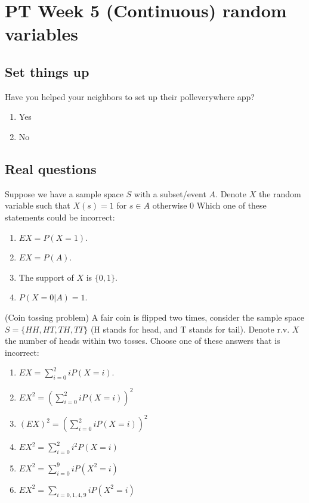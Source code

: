 \documentclass[poll_tutorial_format]{subfiles}
\begin{document}
	\maketitle
	\section{PT Week 5 (Continuous) random variables}
	
	\subsection{Set things up}
	\label{sec:set-things-up}
	
	
	
	\setcounter{theorem}{-1}
	\begin{exercise}
		Have you helped your neighbors to set up their polleverywhere app? 
		\begin{enumerate}
			\item Yes
			\item No
		\end{enumerate}
	\end{exercise}
	
	\subsection{Real questions}
	\label{sec:start-real-questions pt week 4}
	\begin{exercise}
		Suppose we have a sample space $S$ with a subset/event $A$. Denote $X$ the random variable such that $X(s)=1$ for $s\in A$ otherwise $0$ 
		Which one of these statements could be incorrect:%
		\begin{enumerate}
			\item $EX=P(X=1)$.
			\item $EX=P(A)$.
			\item The support of $X$ is $\{0,1\}$.
			\item $P(X=0|A)=1$. 
		\end{enumerate}
	\end{exercise}
	
	
	\begin{exercise}
		(Coin tossing problem) A fair coin is flipped two times, consider the sample space $S=\{HH, HT, TH, TT\}$ (H stands for head, and T stands for tail). Denote r.v. $X$ the number of heads within two tosses.
		Choose one of these answers that is incorrect: %
		\begin{enumerate}
			\item $EX=\sum_{i=0}^2 iP(X=i)$.
			\item $EX^2=\left(\sum_{i=0}^2 iP(X=i) \right)^2$
			\item $(EX)^2=\left(\sum_{i=0}^2 iP(X=i)\right)^2$
			\item $EX^2=\sum_{i=0}^2 i^2P(X=i)$
			\item $EX^2=\sum_{i=0}^9 iP(X^2=i)$
			\item $EX^2=\sum_{i=0,1,4,9} iP(X^2=i)$
		\end{enumerate}
	\end{exercise}
	
\end{document}
